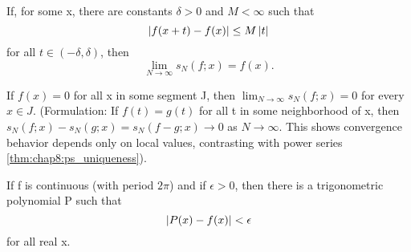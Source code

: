 
\begin{theorem} %
  \label{thm:chap8:fourier_pointwise_conv}
  If, for some x, there are constants $\delta > 0$ and $M < \infty$ such that
  \begin{equation} \label{eq:chap8:pointwise_holder_cond}
    \left\lvert f(x+t) - f(x) \right\rvert \le M \left\lvert t \right\rvert
  \end{equation}
  for all $t \in (-\delta, \delta)$, then
  \begin{equation} \label{eq:chap8:pointwise_conv_result}
    \lim_{N \to \infty} s_N(f; x) = f(x).
  \end{equation}
\end{theorem}

\begin{corollary} %
  \label{cor:chap8:fourier_localization}
  If $f(x) = 0$ for all x in some segment J, then $\lim_{N \to
  \infty} s_N(f; x) = 0$ for every $x \in J$.
  (Formulation: If $f(t) = g(t)$ for all t in some neighborhood of x,
    then $s_N(f; x) - s_N(g; x) = s_N(f-g; x) \to 0$ as $N \to \infty$.
    This shows convergence behavior depends only on local values,
  contrasting with power series \autoref{thm:chap8:ps_uniqueness}).
\end{corollary}




\begin{theorem} %
  \label{thm:chap8:trig_poly_approx}
  If f is continuous (with period $2\pi$) and if $\epsilon > 0$, then
  there is a trigonometric polynomial P such that
  \[ \left\lvert P(x) - f(x) \right\rvert < \epsilon \]
  for all real x.
\end{theorem}


